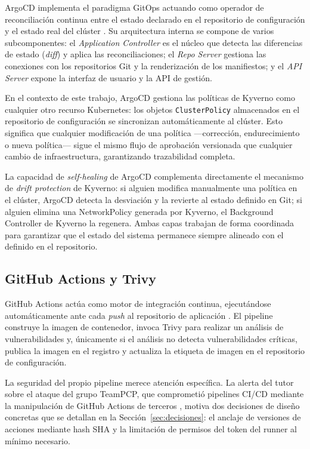 ArgoCD implementa el paradigma GitOps actuando como operador de reconciliación continua entre el estado declarado en el repositorio de configuración y el estado real del clúster \cite{argocd_docs}. Su arquitectura interna se compone de varios subcomponentes: el \textit{Application Controller} es el núcleo que detecta las diferencias de estado (\textit{diff}) y aplica las reconciliaciones; el \textit{Repo Server} gestiona las conexiones con los repositorios Git y la renderización de los manifiestos; y el \textit{API Server} expone la interfaz de usuario y la API de gestión.

En el contexto de este trabajo, ArgoCD gestiona las políticas de Kyverno como cualquier otro recurso Kubernetes: los objetos \texttt{ClusterPolicy} almacenados en el repositorio de configuración se sincronizan automáticamente al clúster. Esto significa que cualquier modificación de una política —corrección, endurecimiento o nueva política— sigue el mismo flujo de aprobación versionada que cualquier cambio de infraestructura, garantizando trazabilidad completa.

La capacidad de \textit{self-healing} de ArgoCD complementa directamente el mecanismo de \textit{drift protection} de Kyverno: si alguien modifica manualmente una política en el clúster, ArgoCD detecta la desviación y la revierte al estado definido en Git; si alguien elimina una NetworkPolicy generada por Kyverno, el Background Controller de Kyverno la regenera. Ambas capas trabajan de forma coordinada para garantizar que el estado del sistema permanece siempre alineado con el definido en el repositorio.

\subsection{GitHub Actions y Trivy}

GitHub Actions actúa como motor de integración continua, ejecutándose automáticamente ante cada \textit{push} al repositorio de aplicación \cite{github_actions_docs}. El pipeline construye la imagen de contenedor, invoca Trivy para realizar un análisis de vulnerabilidades \cite{trivy_docs} y, únicamente si el análisis no detecta vulnerabilidades críticas, publica la imagen en el registro y actualiza la etiqueta de imagen en el repositorio de configuración.

La seguridad del propio pipeline merece atención específica. La alerta del tutor sobre el ataque del grupo TeamPCP, que comprometió pipelines CI/CD mediante la manipulación de GitHub Actions de terceros \cite{teampcp2026}, motiva dos decisiones de diseño concretas que se detallan en la Sección~\ref{sec:decisiones}: el anclaje de versiones de acciones mediante hash SHA y la limitación de permisos del token del runner al mínimo necesario.

